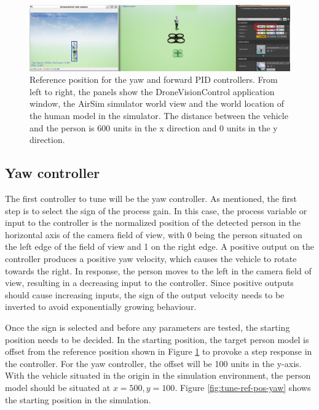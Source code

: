 
\begin{figure}[H]
  \centering
  \includegraphics[width=\textwidth, keepaspectratio]{img/pid/tune-ref-pos.jpg}
  \caption{Reference position for the yaw and forward PID controllers. From left to right, the panels show the DroneVisionControl application window, the AirSim simulator world view and the world location of the human model in the simulator. The distance between the vehicle and the person is 600 units in the x direction and 0 units in the y direction.}
  \label{fig:tune-start-pos}
\end{figure}


\subsection{Yaw controller}
The first controller to tune will be the yaw controller. As mentioned, the first step is to select the sign of the process gain. In this case, the process variable or input to the controller is the normalized position of the detected person in the horizontal axis of the camera field of view, with 0 being the person situated on the left edge of the field of view and 1 on the right edge. A positive output on the controller produces a positive yaw velocity, which causes the vehicle to rotate towards the right. In response, the person moves to the left in the camera field of view, resulting in a decreasing input to the controller. Since positive outputs should cause increasing inputs, the sign of the output velocity needs to be inverted to avoid exponentially growing behaviour.

Once the sign is selected and before any parameters are tested, the starting position needs to be decided. In the starting position, the target person model is offset from the reference position shown in Figure \ref{fig:tune-start-pos} to provoke a step response in the controller. For the yaw controller, the offset will be 100 units in the y-axis. With the vehicle situated in the origin in the simulation environment, the person model should be situated at $x=500, y=100$. Figure \ref{fig:tune-ref-pos-yaw} shows the starting position in the simulation.

